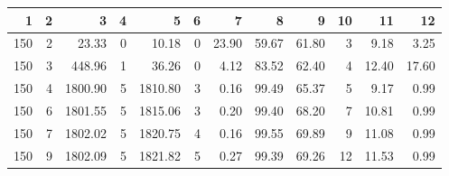 \begin{tabular}{rrrrrrrrrrrr}
\toprule
1 & 2 & 3 & 4 & 5 & 6 & 7 & 8 & 9 & 10 & 11 & 12 \\
\midrule
150 & 2 & 23.33 & 0 & 10.18 & 0 & 23.90 & 59.67 & 61.80 & 3 & 9.18 & 3.25 \\
150 & 3 & 448.96 & 1 & 36.26 & 0 & 4.12 & 83.52 & 62.40 & 4 & 12.40 & 17.60 \\
150 & 4 & 1800.90 & 5 & 1810.80 & 3 & 0.16 & 99.49 & 65.37 & 5 & 9.17 & 0.99 \\
150 & 6 & 1801.55 & 5 & 1815.06 & 3 & 0.20 & 99.40 & 68.20 & 7 & 10.81 & 0.99 \\
150 & 7 & 1802.02 & 5 & 1820.75 & 4 & 0.16 & 99.55 & 69.89 & 9 & 11.08 & 0.99 \\
150 & 9 & 1802.09 & 5 & 1821.82 & 5 & 0.27 & 99.39 & 69.26 & 12 & 11.53 & 0.99 \\
\bottomrule
\end{tabular}

